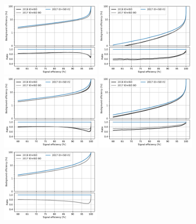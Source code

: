 \begin{figure}[!htb]
   \vspace*{0.3cm}
   \begin{center}
      \includegraphics[width=0.45\textwidth]{Figures/Electrons/2018_EB1_5.pdf}
      \includegraphics[width=0.45\textwidth]{Figures/Electrons/2018_EB1_10.pdf} \\
      \includegraphics[width=0.45\textwidth]{Figures/Electrons/2018_EB2_5.pdf}
      \includegraphics[width=0.45\textwidth]{Figures/Electrons/2018_EB2_10.pdf}\\
      \includegraphics[width=0.45\textwidth]{Figures/Electrons/2018_EE_5.pdf}

\end{center}
\end{figure}
